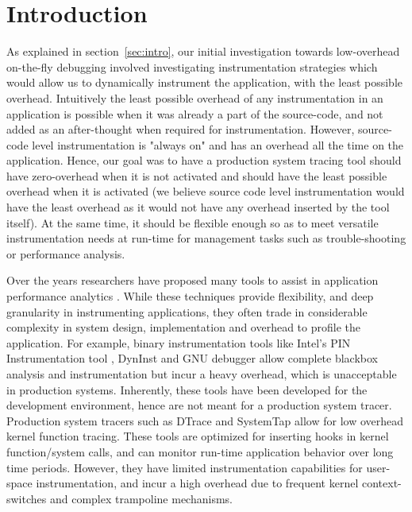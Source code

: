 \section{Introduction}
\label{sec:iProbeIntro}

As explained in section~\ref{sec:intro}, our initial investigation towards low-overhead on-the-fly debugging involved investigating instrumentation strategies which would allow us to dynamically instrument the application, with the least possible overhead.
Intuitively the least possible overhead of any instrumentation in an application is possible when it was already a part of the source-code, and not added as an after-thought when required for instrumentation.
However, source-code level instrumentation is "always on" and has an overhead all the time on the application.
Hence, our goal was to have a production system tracing tool should have zero-overhead when it is not activated and should have the least possible overhead when it is activated (we believe source code level instrumentation would have the least overhead as it would not have any overhead inserted by the tool itself). 
At the same time, it should be flexible enough so as to meet versatile instrumentation needs at run-time for management tasks such as trouble-shooting or performance analysis.

Over the years researchers have proposed many tools to assist in application performance analytics \cite{pin,gdb,dtrace,systemtap,lttng,utrace,ptrace,dyninst}.
While these techniques provide flexibility, and deep granularity in instrumenting applications, they often trade in considerable complexity in system design, implementation and overhead to profile the application. 
For example, binary instrumentation tools like Intel's PIN Instrumentation tool \cite{pin}, DynInst \cite{dyninst} and GNU debugger \cite{gdb} allow complete blackbox analysis and instrumentation but incur a heavy overhead, which is unacceptable in production systems. 
Inherently, these tools have been developed for the development environment, hence are not meant for a production system tracer.
Production system tracers such as DTrace\cite{dtrace} and SystemTap\cite{systemtap} allow for low overhead kernel function tracing.
These tools are optimized for inserting hooks in kernel function/system calls, and can monitor run-time application behavior over long time periods. 
However, they have limited instrumentation capabilities for user-space instrumentation, and incur a high overhead due to frequent kernel context-switches and complex trampoline mechanisms.

